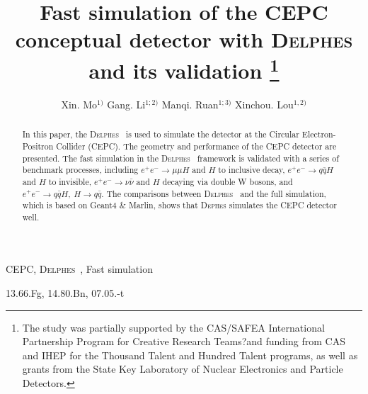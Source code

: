\documentclass[a4paper,10pt,twoside]{cpc-hepnp}
\begin{document}



\title{Fast simulation of the CEPC conceptual detector with  {\textsc{Delphes}} and its validation
\thanks{The study was partially supported by the CAS/SAFEA International Partnership Program for Creative Research Teams?and funding from CAS and IHEP for the Thousand Talent and Hundred Talent programs, as well as grants from the State Key Laboratory of Nuclear Electronics and Particle Detectors.}}

\author{%
      Xin. Mo$^{1)}$%
\quad Gang. Li$^{1;2)}$%
\quad Manqi. Ruan$^{1;3)}$%
\quad Xinchou. Lou$^{1,2)}$%
}
\maketitle


\address{%
$^1$ Institute of High Energy Physics, Chinese Academy of Sciences, Beijing 100049, China\\
$^2$ University of Texas at Dallas, Richardson, TX 75080-3021, USA
}


\begin{abstract}
In this paper, the {\textsc{Delphes}~} is used to simulate the detector at the Circular Electron-Positron Collider (CEPC). The geometry and performance of the CEPC detector are presented. The fast simulation in the {\textsc{Delphes}~} framework is validated with  a series of  benchmark processes, including $e^+e^- \to \mu\mu H$ and $H$ to inclusive decay,  $e^+e^- \to q\bar{q}H$ and $H$ to invisible,  $e^+e^- \to \nu\bar{\nu}$ and $H$ decaying via double W bosons, and $e^+e^- \to q\bar{q}H,~ H \to q\bar{q}$. The comparisons between {\textsc{Delphes}~} and the full simulation, which is based on Geant4 \& Marlin, shows that {\textsc{Dephes}} simulates the CEPC detector well.
\end{abstract}


\begin{keyword}
CEPC, {\textsc{Delphes}~}, Fast simulation
\end{keyword}

\begin{pacs}
13.66.Fg, 14.80.Bn, 07.05.-t
\end{pacs}
\end{document}
